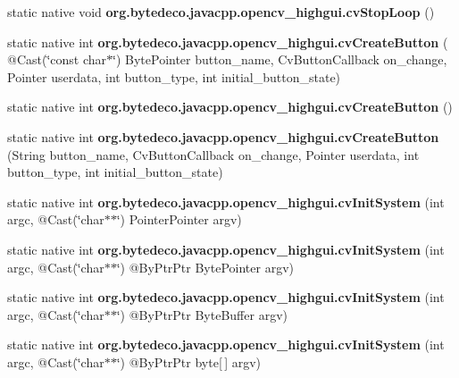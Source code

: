\begin{DoxyCompactItemize}
static native void {\bfseries org.\+bytedeco.\+javacpp.\+opencv\+\_\+highgui.\+cv\+Stop\+Loop} ()
\item 
\mbox{\label{group__highgui__c_ga73e273d0d4ec31c6a2d4ef8ce61397f3}} 
static native int {\bfseries org.\+bytedeco.\+javacpp.\+opencv\+\_\+highgui.\+cv\+Create\+Button} ( @Cast(\char`\"{}const char$\ast$\char`\"{}) Byte\+Pointer button\+\_\+name, Cv\+Button\+Callback on\+\_\+change, Pointer userdata, int button\+\_\+type, int initial\+\_\+button\+\_\+state)
\item 
\mbox{\label{group__highgui__c_gac66242744a776d09f12eaeeb0757d2b7}} 
static native int {\bfseries org.\+bytedeco.\+javacpp.\+opencv\+\_\+highgui.\+cv\+Create\+Button} ()
\item 
\mbox{\label{group__highgui__c_ga497b0df96ae9bf22df1bf306b75f4d23}} 
static native int {\bfseries org.\+bytedeco.\+javacpp.\+opencv\+\_\+highgui.\+cv\+Create\+Button} (String button\+\_\+name, Cv\+Button\+Callback on\+\_\+change, Pointer userdata, int button\+\_\+type, int initial\+\_\+button\+\_\+state)
\item 
\mbox{\label{group__highgui__c_ga4523687054a70aebe123cd03c77dc235}} 
static native int {\bfseries org.\+bytedeco.\+javacpp.\+opencv\+\_\+highgui.\+cv\+Init\+System} (int argc, @Cast(\char`\"{}char$\ast$$\ast$\char`\"{}) Pointer\+Pointer argv)
\item 
\mbox{\label{group__highgui__c_gaa4ffb74bfa38b577ea5fd5bc065c2a98}} 
static native int {\bfseries org.\+bytedeco.\+javacpp.\+opencv\+\_\+highgui.\+cv\+Init\+System} (int argc, @Cast(\char`\"{}char$\ast$$\ast$\char`\"{}) @By\+Ptr\+Ptr Byte\+Pointer argv)
\item 
\mbox{\label{group__highgui__c_gabc1ef3d3d806d5b441694f17e47b8995}} 
static native int {\bfseries org.\+bytedeco.\+javacpp.\+opencv\+\_\+highgui.\+cv\+Init\+System} (int argc, @Cast(\char`\"{}char$\ast$$\ast$\char`\"{}) @By\+Ptr\+Ptr Byte\+Buffer argv)
\item 
\mbox{\label{group__highgui__c_ga0ee3e1c652ddfe3be86ada6232bebc21}} 
static native int {\bfseries org.\+bytedeco.\+javacpp.\+opencv\+\_\+highgui.\+cv\+Init\+System} (int argc, @Cast(\char`\"{}char$\ast$$\ast$\char`\"{}) @By\+Ptr\+Ptr byte\mbox{[}$\,$\mbox{]} argv)

\end{DoxyCompactItemize}
